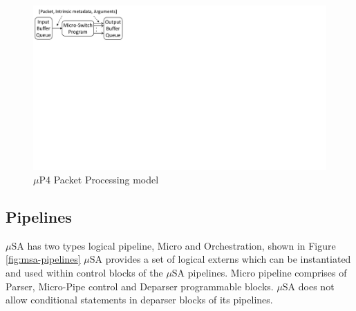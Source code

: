 


\begin{figure}
    \centering
    \includegraphics[trim=0 420 667 0, clip, scale=0.5]{microp4-program-model}
    \caption{$\mu$P4 Packet Processing model}
    \label{fig:mp4-packet-processing-model}
\end{figure}

\subsection{Pipelines}
\label{subsection:pipelines}
$\mu$SA has two types logical pipeline, Micro and Orchestration, shown in Figure \ref{fig:msa-pipelines}
$\mu$SA provides a set of logical externs which can be instantiated and used within control blocks of the $\mu$SA pipelines.
Micro pipeline comprises of Parser, Micro-Pipe control and Deparser programmable blocks.
$\mu$SA does not allow conditional statements in deparser blocks of its pipelines.

